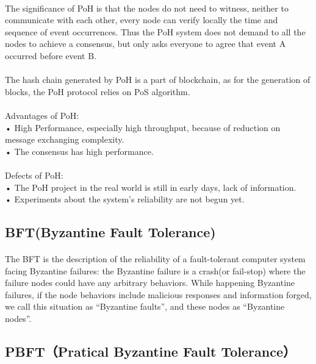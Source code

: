 \documentclass[doublespacing]{bmcart}
\begin{document}
\begin{CJK*}{UTF8}{gbsn}
	\paragraph{} 
	The significance of PoH is that  the nodes do not need to witness, neither to communicate with each other, every node can verify locally the time and sequence of event occurrences. Thus the PoH system does not demand to all the nodes to achieve a consensus, but only asks everyone to agree that event A occurred before event B.
	\paragraph{} 
	The hash chain generated by PoH is a part of blockchain, as for the generation of blocks, the PoH protocol relies on PoS algorithm.
	
	\paragraph{} 
Advantages of PoH:
\\• High Performance, especially high throughput, because of reduction on message exchanging complexity.
\\• The consensus has high performance.
	\paragraph{} 
Defects of PoH:
\\• The PoH project in the real world is still in early days, lack of information.
\\• Experiments about the system's reliability are not begun yet. 
	
	\subsection{BFT(Byzantine Fault Tolerance)}
	\paragraph{} 
	The BFT is the description of the reliability of a fault-tolerant computer system facing Byzantine failures: the Byzantine failure is a crash(or fail-stop) where the failure nodes could have any arbitrary behaviors.
	While happening Byzantine failures, if the node behaviors include malicious responses and information forged, we call this situation as ``Byzantine faults'', and these nodes as ``Byzantine nodes''.
	
\subsection{PBFT（Pratical Byzantine Fault Tolerance）}

\end{CJK*}
\end{document}
